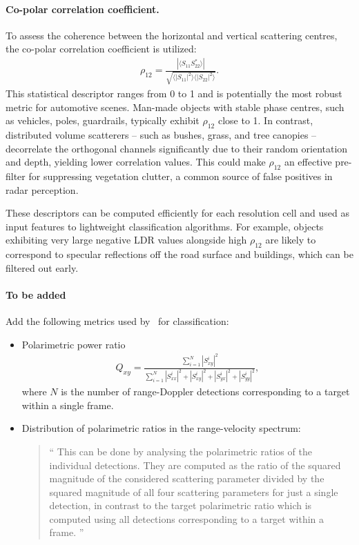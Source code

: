 \paragraph{Co-polar correlation coefficient.} To assess the coherence between the horizontal and vertical scattering centres, the co-polar correlation coefficient is utilized:
\begin{align}
    \label{eq:copolar-correlation-coefficient}
    \rho_{12} = \frac{|\langle S_{11} S_{22}^* \rangle|}{\sqrt{\langle |S_{11}|^2 \rangle \langle |S_{22}|^2 \rangle}}.
\end{align}
This statistical descriptor ranges from 0 to 1 and is potentially the most robust metric for automotive scenes.
Man-made objects with stable phase centres, such as vehicles, poles, guardrails, typically exhibit $\rho_{12}$ close to 1.
In contrast, distributed volume scatterers -- such as bushes, grass, and tree canopies -- decorrelate the orthogonal channels significantly due to their random orientation and depth, yielding lower correlation values.
This could make $\rho_{12}$ an effective pre-filter for suppressing vegetation clutter, a common source of false positives in radar perception.

These descriptors can be computed efficiently for each resolution cell and used as input features to lightweight classification algorithms.
For example, objects exhibiting very large negative LDR values alongside high $\rho_{12}$ are likely to correspond to specular reflections off the road surface and buildings, which can be filtered out early.

\paragraph{To be added} Add the following metrics used by~\textcite{bouwmeesterClassificationDynamicVulnerable2025} for classification:
\begin{itemize}
    \item Polarimetric power ratio
    \begin{align}
        Q_{xy} = \frac{\sum_{i=1}^N |S_{xy}^i|^2}{\sum_{i=1}^N |S_{xx}^i|^2 + |S_{xy}^i|^2 + |S_{yx}^i|^2 + |S_{yy}^i|^2},
    \end{align}
    where $N$ is the number of range-Doppler detections corresponding to a target within a single frame.

    \item Distribution of polarimetric ratios in the range-velocity spectrum:
    \begin{quote}
        \enquote{
            This can be done by analysing the polarimetric ratios of the individual detections.
            They are computed as the ratio of the squared magnitude of the considered scattering parameter divided by the squared magnitude of all four scattering parameters for just a single detection, in contrast to the target polarimetric ratio which is computed using all detections corresponding to a target within a frame.
        }
    \end{quote}
\end{itemize}

